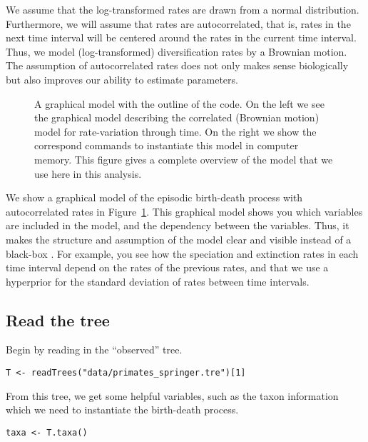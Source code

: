 We assume that the log-transformed rates are drawn from a normal distribution.
Furthermore, we will assume that rates are autocorrelated, that is, rates in the next time interval will be centered around the rates in the current time interval.
Thus, we model (log-transformed) diversification rates by a Brownian motion.
The assumption of autocorrelated rates does not only makes sense biologically but also improves our ability to estimate parameters.
\begin{figure}[h!]
\centering
{}
\caption{\small A graphical model with the outline of the \Rev code. On the left we see the graphical model describing the correlated (Brownian motion) model for rate-variation through time. On the right we show the correspond \Rev commands to instantiate this model in computer memory. This figure gives a complete overview of the model that we use here in this analysis.}
\label{fig:EBD_GM}
\end{figure}
We show a graphical model of the episodic birth-death process with autocorrelated rates in Figure~\ref{fig:EBD_GM}.
This graphical model shows you which variables are included in the model, and the dependency between the variables.
Thus, it makes the structure and assumption of the model clear and visible instead of a black-box \citep{Hoehna2014b}.
For example, you see how the speciation and extinction rates in each time interval depend on the rates of the previous rates, and that we use a hyperprior for the standard deviation of rates between time intervals.


\subsection{Read the tree}

Begin by reading in the ``observed'' tree. 

{\tt \begin{snugshade*}
\begin{lstlisting}
T <- readTrees("data/primates_springer.tre")[1]
\end{lstlisting}
\end{snugshade*}}

From this tree, we get some helpful variables, such as the taxon information which we need to instantiate the birth-death process.
{\tt \begin{snugshade*}
\begin{lstlisting}
taxa <- T.taxa()
\end{lstlisting}
\end{snugshade*}}

